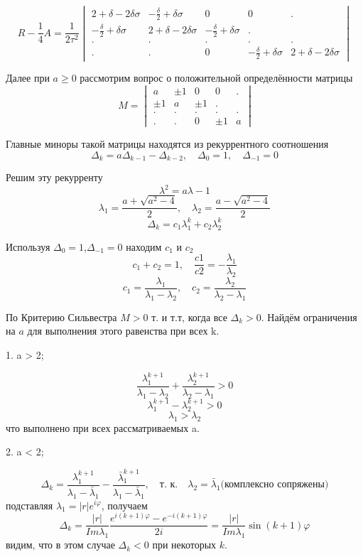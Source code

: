 \documentclass[12pt,a4paper]{article}
\renewcommand{\geq}{\geqslant}
\begin{document}
 $$R - \frac{1}{4}A = \frac{1}{2\tau^2}\begin{vmatrix}
2 + \delta - 2\delta\sigma & -\frac{\delta}{2} + \delta\sigma & 0 & 0&.\\
-\frac{\delta}{2} + \delta \sigma & 2 + \delta - 2\delta\sigma  & -\frac{\delta}{2} + \delta\sigma & .\\
.&.&.&.&.\\
.&.&0&-\frac{\delta}{2} + \delta\sigma & 2 + \delta - 2\delta\sigma 
\end{vmatrix}$$



Далее при $a\geq0$ рассмотрим вопрос о положительной определённости матрицы  $$\ M  = \begin{vmatrix}
a & \pm1 & 0 & 0&.\\
\pm1 & a & \pm1 & .\\
.&.&.&.&.\\
.&.&0&\pm1&a 
\end{vmatrix}$$

Главные миноры такой матрицы находятся из рекуррентного соотношения 
$$\Delta_k = a\Delta_{k-1} - \Delta_{k-2}, \quad \Delta_0 = 1,\quad \Delta_{-1} = 0 $$

Решим эту рекурренту $$\lambda^2= a\lambda-1$$
$$\lambda_1 = \frac{a+\sqrt{a^2-4}}{2},\quad\lambda_2 = \frac{a-\sqrt{a^2-4}}{2}$$
$$\Delta_k = c_1\lambda_1^k + c_2\lambda_2^k$$

Используя $ \Delta_0 = 1$,\quad$ \Delta_{-1} = 0 $ находим $c_1$ и $c_2$
$$c_1+c_2 = 1, \quad \frac{c1}{c2}= -\frac{\lambda_1}{\lambda_2}$$
 $$c_1 =\frac{\lambda_1}{\lambda_1-\lambda_2},  \quad c_2 = \frac{\lambda_2}{\lambda_2-\lambda_1}$$
 
По Критерию Сильвестра $M > 0$ т. и т.т, когда все  $\Delta_k > 0$.
Найдём ограничения на $a$ для выполнения этого равенства при всех k.

\begin{flushleft}
1. a > 2;
\end{flushleft}
$$
\frac{\lambda_1^{k+1}}{\lambda_1-\lambda_2} + \frac{\lambda_2^{k+1}}{\lambda_2-\lambda_1} > 0$$
$$\lambda_1^{k+1} - \lambda_2^{k+1}>0$$
$$\lambda_1>\lambda_2$$
что выполнено при всех рассматриваемых a.

\begin{flushleft}
2. a < 2;
\end{flushleft}
$$\Delta_k = \frac{\lambda_1^{k+1}}{\lambda_1-\bar{\lambda}_1} - \frac{\bar{\lambda}_1^{k+1}}{\lambda_1-\bar{\lambda}_1}, \quad \text{т. к.}\quad\lambda_2 = \bar{\lambda}_1\text{(комплексно сопряжены)}$$
подставляя $\lambda_1 = |r|e^{i\varphi}$, получаем 
$$\Delta_k = \frac{|r|}{Im\lambda_1}\frac{e^{i(k+1)\varphi} - e^{-i(k+1)\varphi}}{2i} = \frac{|r|}{Im\lambda_1}\sin{(k+1)\varphi}$$
видим, что в этом случае $\Delta_k < 0$ при некоторых $k$.
\end{document}
